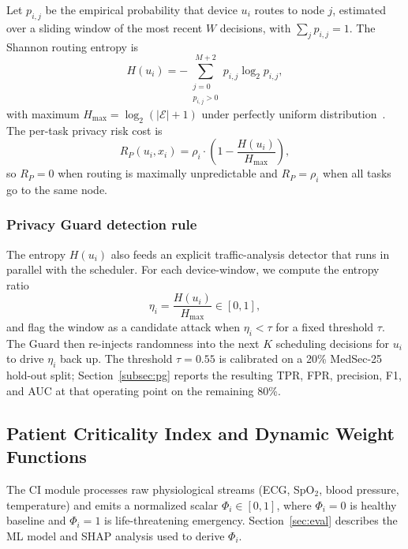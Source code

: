 \documentclass[journal]{IEEEtran}
\newcommand{\set}[1]{\mathcal{#1}}
\begin{document}
Let $p_{i,j}$ be the empirical probability that device $u_i$ routes to
node $j$, estimated over a sliding window of the most recent $W$
decisions, with $\sum_{j} p_{i,j} = 1$. The Shannon routing entropy is
\begin{equation}
  H(u_i) = -\!\sum_{\substack{j=0 \\ p_{i,j}>0}}^{M+2}
              p_{i,j} \log_2 p_{i,j},
  \label{eq:shannon_entropy}
\end{equation}
with maximum $H_{\max} = \log_2(|\set{E}|+1)$ under perfectly uniform
distribution~\cite{shannon1948}. The per-task privacy risk cost is
\begin{equation}
  R_P(u_i, x_i) = \rho_i \cdot \left(1 - \frac{H(u_i)}{H_{\max}}\right),
  \label{eq:privacy_risk}
\end{equation}
so $R_P = 0$ when routing is maximally unpredictable and $R_P = \rho_i$
when all tasks go to the same node.

\subsubsection{Privacy Guard detection rule}
\label{subsec:pg_rule}
The entropy $H(u_i)$ also feeds an explicit traffic-analysis detector
that runs in parallel with the scheduler. For each device-window, we
compute the entropy ratio
\begin{equation}
  \eta_i = \frac{H(u_i)}{H_{\max}} \in [0, 1],
  \label{eq:eta_ratio}
\end{equation}
and flag the window as a candidate attack when $\eta_i < \tau$ for a
fixed threshold $\tau$. The Guard then re-injects randomness into the
next $K$ scheduling decisions for $u_i$ to drive $\eta_i$ back up. The
threshold $\tau = 0.55$ is calibrated on a 20\% MedSec-25 hold-out
split; Section~\ref{subsec:pg} reports the resulting TPR, FPR,
precision, F1, and AUC at that operating point on the remaining 80\%.

\subsection{Patient Criticality Index and Dynamic Weight Functions}
\label{subsec:ci}

The CI module processes raw physiological streams (ECG, SpO$_2$,
blood pressure, temperature) and emits a normalized scalar
$\Phi_i \in [0,1]$, where $\Phi_i = 0$ is healthy baseline and
$\Phi_i = 1$ is life-threatening emergency. Section~\ref{sec:eval}
describes the ML model and SHAP analysis used to derive $\Phi_i$.
\end{document}
